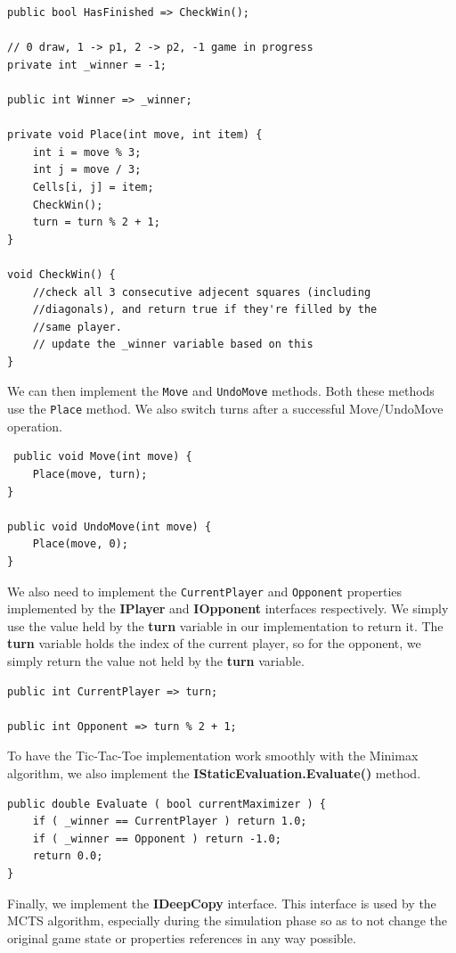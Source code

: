 \begin{lstlisting}
public bool HasFinished => CheckWin();

// 0 draw, 1 -> p1, 2 -> p2, -1 game in progress
private int _winner = -1; 

public int Winner => _winner;

private void Place(int move, int item) {
    int i = move % 3;
    int j = move / 3;
    Cells[i, j] = item;
    CheckWin();
    turn = turn % 2 + 1;
}

void CheckWin() {
    //check all 3 consecutive adjecent squares (including
    //diagonals), and return true if they're filled by the
    //same player.
    // update the _winner variable based on this
}

\end{lstlisting}

We can then implement the \texttt{Move} and \texttt{UndoMove} methods. Both these methods use the \texttt{Place} method.
We also switch turns after a successful Move/UndoMove operation.
\begin{lstlisting}
 public void Move(int move) {
    Place(move, turn);
}

public void UndoMove(int move) {
    Place(move, 0);
}
\end{lstlisting}

We also need to implement the \texttt{CurrentPlayer} and \texttt{Opponent} properties implemented by the \textbf{IPlayer} and \textbf{IOpponent} interfaces respectively. We simply use the value held by the \textbf{turn} variable in our implementation to return it. The \textbf{turn} variable holds the index of the current player, so for the opponent, we simply return the value not held by the \textbf{turn} variable.

\begin{lstlisting}
public int CurrentPlayer => turn;

public int Opponent => turn % 2 + 1;    
\end{lstlisting}

To have the Tic-Tac-Toe implementation work smoothly with the Minimax algorithm, we also implement the \textbf{IStaticEvaluation.Evaluate()} method.
\begin{lstlisting}
public double Evaluate ( bool currentMaximizer ) {
    if ( _winner == CurrentPlayer ) return 1.0;
    if ( _winner == Opponent ) return -1.0;
    return 0.0;
}
\end{lstlisting}

Finally, we implement the \textbf{IDeepCopy} interface. This interface is used by the \gls{MCTS} algorithm, especially during the simulation phase so as to not change the original game state or properties references in any way possible.

